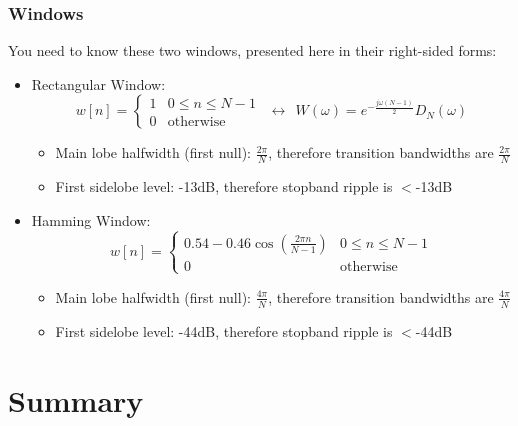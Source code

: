 \documentclass{beamer}
\begin{document}
\begin{frame}
  \frametitle{Windows}

  You need to know these two windows, presented here in
  their right-sided forms:
  \begin{itemize}
  \item Rectangular Window:
    \begin{displaymath}
      w[n]=\begin{cases}1&0\le n\le N-1\\0&\mbox{otherwise}\end{cases}~~\leftrightarrow~~
      W(\omega) = e^{-\frac{j\omega (N-1)}{2}}D_N(\omega)
    \end{displaymath}
    \begin{itemize}
    \item Main lobe halfwidth (first null): $\frac{2\pi}{N}$, therefore transition bandwidths
      are $\frac{2\pi}{N}$
    \item First sidelobe level: -13dB, therefore stopband ripple is $<$-13dB
    \end{itemize}
  \item Hamming Window:
    \begin{displaymath}
      w[n]=\begin{cases}
      0.54-0.46\cos\left(\frac{2\pi n}{N-1}\right)&0\le n\le N-1\\0&\mbox{otherwise}
      \end{cases}
    \end{displaymath}
    \begin{itemize}
    \item Main lobe halfwidth (first null): $\frac{4\pi}{N}$, therefore transition bandwidths
      are $\frac{4\pi}{N}$
    \item First sidelobe level: -44dB, therefore stopband ripple is $<$-44dB
    \end{itemize}
  \end{itemize}
\end{frame}

\section[Summary]{Summary}
\setcounter{subsection}{1}
\end{document}
